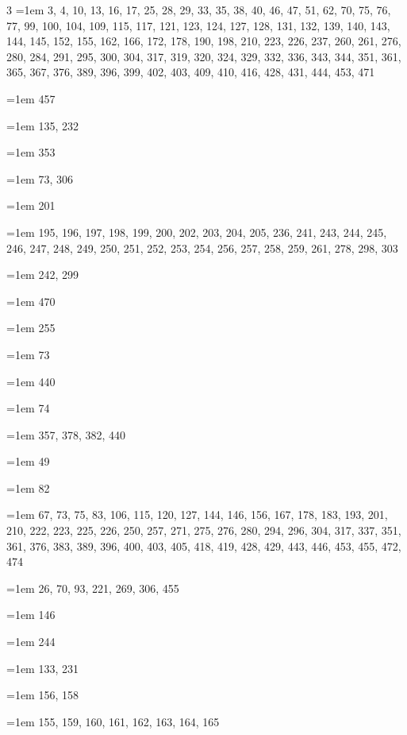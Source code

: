 \begin{multicols}{3}
\hangindent=1em  3, 4, 10, 13, 16, 17, 25, 28, 29, 33, 35, 38, 40, 46, 47, 51, 62, 70, 75, 76, 77, 99, 100, 104, 109, 115, 117, 121, 123, 124, 127, 128, 131, 132, 139, 140, 143, 144, 145, 152, 155, 162, 166, 172, 178, 190, 198, 210, 223, 226, 237, 260, 261, 276, 280, 284, 291, 295, 300, 304, 317, 319, 320, 324, 329, 332, 336, 343, 344, 351, 361, 365, 367, 376, 389, 396, 399, 402, 403, 409, 410, 416, 428, 431, 444, 453, 471\par
\hangindent=1em  457\par
\hangindent=1em  135, 232\par
\hangindent=1em  353\par
\hangindent=1em  73, 306\par
\hangindent=1em  201\par
\hangindent=1em  195, 196, 197, 198, 199, 200, 202, 203, 204, 205, 236, 241, 243, 244, 245, 246, 247, 248, 249, 250, 251, 252, 253, 254, 256, 257, 258, 259, 261, 278, 298, 303\par
\hangindent=1em  242, 299\par
\hangindent=1em  470\par
\hangindent=1em  255\par
\hangindent=1em  73\par
\hangindent=1em  440\par
\hangindent=1em  74\par
\hangindent=1em  357, 378, 382, 440\par
\hangindent=1em  49\par
\hangindent=1em  82\par
\hangindent=1em  67, 73, 75, 83, 106, 115, 120, 127, 144, 146, 156, 167, 178, 183, 193, 201, 210, 222, 223, 225, 226, 250, 257, 271, 275, 276, 280, 294, 296, 304, 317, 337, 351, 361, 376, 383, 389, 396, 400, 403, 405, 418, 419, 428, 429, 443, 446, 453, 455, 472, 474\par
\hangindent=1em  26, 70, 93, 221, 269, 306, 455\par
\hangindent=1em  146\par
\hangindent=1em  244\par
\hangindent=1em  133, 231\par
\hangindent=1em  156, 158\par
\hangindent=1em  155, 159, 160, 161, 162, 163, 164, 165\par

\end{multicols}
